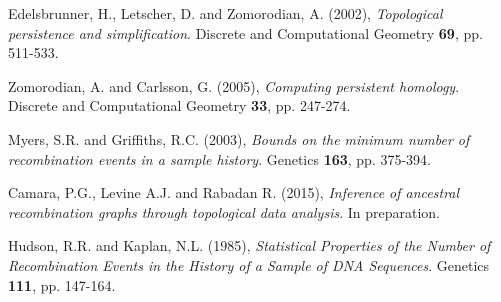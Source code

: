 \documentclass[12pt]{article}
\begin{document}
\begin{thebibliography}{99}

 Edelsbrunner, H., Letscher, D. and Zomorodian, A. (2002), \emph{Topological persistence and simplification}. Discrete and Computational Geometry {\bf 69}, pp. 511-533.

 Zomorodian, A. and Carlsson, G. (2005), \emph{Computing persistent homology}. Discrete and Computational Geometry {\bf 33}, pp. 247-274.

 Myers, S.R. and Griffiths, R.C. (2003), \emph{Bounds on the minimum number of recombination events in a sample history}. Genetics {\bf 163}, pp. 375-394.

 Camara, P.G., Levine A.J. and Rabadan R. (2015), \emph{Inference of ancestral recombination graphs through topological data analysis}. In preparation.

 Hudson, R.R. and Kaplan, N.L. (1985), \emph{Statistical Properties of the Number of Recombination Events in the History of a Sample of DNA Sequences}. Genetics {\bf 111}, pp. 147-164.

\end{thebibliography}
\end{document}
